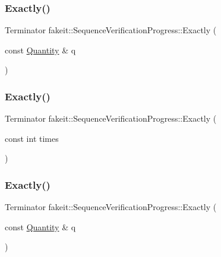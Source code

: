 \subsubsection{\texorpdfstring{Exactly()}{Exactly()}\hspace{0.1cm}{\footnotesize\ttfamily [14/18]}}
{\footnotesize\ttfamily Terminator fakeit\+::\+Sequence\+Verification\+Progress\+::\+Exactly (\begin{DoxyParamCaption}\item[{const \mbox{\hyperlink{structfakeit_1_1Quantity}{Quantity}} \&}]{q }\end{DoxyParamCaption})\hspace{0.3cm}{\ttfamily [inline]}}

\mbox{\label{classfakeit_1_1SequenceVerificationProgress_a74c04958c69e3c977ce873de3787305d}} 
\subsubsection{\texorpdfstring{Exactly()}{Exactly()}\hspace{0.1cm}{\footnotesize\ttfamily [15/18]}}
{\footnotesize\ttfamily Terminator fakeit\+::\+Sequence\+Verification\+Progress\+::\+Exactly (\begin{DoxyParamCaption}\item[{const int}]{times }\end{DoxyParamCaption})\hspace{0.3cm}{\ttfamily [inline]}}

\mbox{\label{classfakeit_1_1SequenceVerificationProgress_abb39ac5b5e16e07b1caaf01325228c47}} 
\subsubsection{\texorpdfstring{Exactly()}{Exactly()}\hspace{0.1cm}{\footnotesize\ttfamily [16/18]}}
{\footnotesize\ttfamily Terminator fakeit\+::\+Sequence\+Verification\+Progress\+::\+Exactly (\begin{DoxyParamCaption}\item[{const \mbox{\hyperlink{structfakeit_1_1Quantity}{Quantity}} \&}]{q }\end{DoxyParamCaption})\hspace{0.3cm}{\ttfamily [inline]}}

